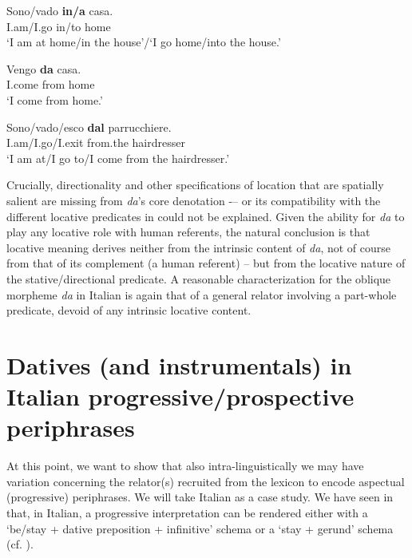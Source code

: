 \documentclass[output=paper,modfonts,nonflat,newtxmath,colorlinks,citecolor=brown]{langsci/langscibook}
\begin{document}
\ea%
    \label{ex:franco:20}
    \ea \label{ex:franco:20a}
    \gll Sono/vado \textbf{in/a} casa.\\
         I.am/I.go in/to home\\
    \glt ‘I am at home/in the house’/‘I go home/into the house.’ 
    
     \ex \label{ex:franco:20b}
    \gll Vengo \textbf{da} casa.\\
        I.come from home\\
    \glt ‘I come from home.’
    
    \ex \label{ex:franco:20c}
    \gll Sono/vado/esco \textbf{dal} parrucchiere.\\
        I.am/I.go/I.exit from.the hairdresser\\
    \glt ‘I am at/I go to/I come from the hairdresser.’
    \z
    \z


Crucially, directionality and other specifications of location that are spatially salient are missing from \textit{da}’s core denotation -– or its compatibility with the different locative predicates in  could not be explained. Given the ability for \textit{da} to play any locative role with human referents, the natural conclusion is that locative meaning derives neither from the intrinsic content of \textit{da}, not of course from that of its complement (a human referent) – but from the locative nature of the stative/directional predicate. A reasonable characterization for the oblique morpheme \textit{da} in Italian is again that of a general relator involving a part-whole predicate, devoid of any intrinsic locative content.
 
\section{Datives (and instrumentals) in Italian progressive/prospective periphrases}
\label{sec:franco:3}

At this point, we want to show that also intra-linguistically we may have variation concerning the relator(s) recruited from the lexicon to encode aspectual (progressive) periphrases. We will take Italian as a case study. We have seen in  that, in Italian, a progressive interpretation can be rendered either with a ‘be/stay + dative preposition + infinitive’ schema  or a ‘stay + gerund’  schema (cf. \citealt{Bertinetto2000}). 
\end{document}
